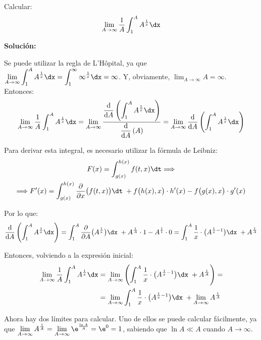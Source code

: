\documentclass[../../main.tex]{subfiles}
\begin{document}
  \begin{shaded}
    Calcular:
    $$
    \lim_{A \to \infty} \frac{1}{A} \int_1^A A^\frac{1}{x} \dx
    $$
  \end{shaded}

  \textbf{Solución:}

  Se puede utilizar la regla de L'Hôpital, ya que $\displaystyle\lim_{A \to \infty} \int_1^A A^\frac{1}{x} \dx = \int_1^\infty \infty^\frac{1}{x} \dx = \infty$. Y, obviamente, $\displaystyle\lim_{A \to \infty} A = \infty$. Entonces:
  $$
  \lim_{A \to \infty} \frac{1}{A} \int_1^A A^\frac{1}{x} \dx =
  \lim_{A \to \infty} \frac{\displaystyle\frac{\text{d}}{\text{d}A}\left(\displaystyle\int_1^A A^\frac{1}{x} \dx\right)}{\displaystyle\frac{\text{d}}{\text{d}A}\left(A\right)} =
  \lim_{A \to \infty} \displaystyle\frac{\text{d}}{\text{d}A}\left(\displaystyle\int_1^A A^\frac{1}{x} \dx\right)
  $$

  Para derivar esta integral, es necesario utilizar la fórmula de Leibniz:
  \begin{multline*}
    F(x) = \int_{g(x)}^{h(x)} f(t, x) \dt \Longrightarrow \\ \Longrightarrow
    F'(x) = \int_{g(x)}^{h(x)} \frac{\partial}{\partial x}\big(f(t, x)\big) \dt \; + f\big(h(x), x\big) \cdot h'(x) - f\big(g(x), x\big) \cdot g'(x)
  \end{multline*}

  Por lo que:
  $$
  \displaystyle\frac{\text{d}}{\text{d}A}\left(\displaystyle\int_1^A A^\frac{1}{x} \dx\right) =
  \int_1^A \frac{\partial}{\partial A}\big(A^\frac{1}{x}\big) \dx \; + A^\frac{1}{A} \cdot 1 - A^\frac{1}{1} \cdot 0 =
  \int_1^A \frac{1}{x} \cdot \big(A^{\frac{1}{x} - 1}\big) \dx \; + A^\frac{1}{A}
  $$

  Entonces, volviendo a la expresión inicial:
  \begin{equation*}
    \begin{split}
      \lim_{A \to \infty} \frac{1}{A} \int_1^A A^\frac{1}{x} \dx & =
      \lim_{A \to \infty} \left(\int_1^A \frac{1}{x} \cdot \big(A^{\frac{1}{x} - 1}\big) \dx \; + A^\frac{1}{A}\right) = \\ & =
      \lim_{A \to \infty} \int_1^A \frac{1}{x} \cdot \big(A^{\frac{1}{x} - 1}\big) \dx \; + \lim_{A \to \infty} A^\frac{1}{A}
    \end{split}
  \end{equation*}

  Ahora hay dos límites para calcular. Uno de ellos se puede calcular fácilmente, ya que $\displaystyle\lim_{A \to \infty} A^\frac{1}{A} = \displaystyle\lim_{A \to \infty} \e^\frac{\ln A}{A} = \e^0 = 1$, sabiendo que $\ln A \ll A$ cuando $A \to \infty$.
\end{document}
